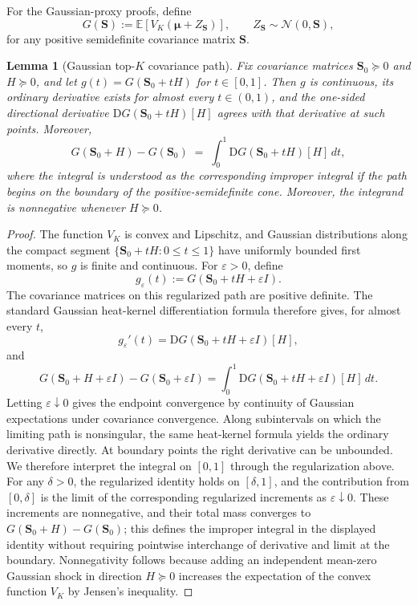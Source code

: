 \documentclass[11pt]{article}
\newtheorem{lemma}[theorem]{Lemma}
\theoremstyle{definition}
\theoremstyle{remark}
\newcommand{\E}{\mathbb{E}}
\newcommand{\1}{\mathbf{1}}
\newcommand{\Normal}{\mathcal{N}}
\newcommand{\bmu}{\boldsymbol{\mu}}
\newcommand{\bS}{\mathbf{S}}
\begin{document}
\medskip

For the Gaussian-proxy proofs, define
\[
G(\bS):=\E\!\left[V_K(\bmu+Z_{\bS})\right],
\qquad Z_{\bS}\sim\Normal(0,\bS),
\]
for any positive semidefinite covariance matrix \(\bS\).

\begin{lemma}[Gaussian top-$K$ covariance path]\label{lem:covariance-path}
Fix covariance matrices \(\bS_0\succeq0\) and \(H\succeq0\), and let
\(g(t)=G(\bS_0+tH)\) for \(t\in[0,1]\). Then \(g\) is continuous, its
ordinary derivative exists for almost every \(t\in(0,1)\), and the
one-sided directional derivative \(\mathrm{D}G(\bS_0+tH)[H]\) agrees with
that derivative at such points. Moreover,
\[
G(\bS_0+H)-G(\bS_0)
\;=\;
\int_0^1 \mathrm{D}G(\bS_0+tH)[H]\,dt ,
\]
where the integral is understood as the corresponding improper integral if
the path begins on the boundary of the positive-semidefinite cone.
Moreover, the integrand is nonnegative whenever \(H\succeq0\).
\end{lemma}

\begin{proof}
The function \(V_K\) is convex and Lipschitz, and Gaussian distributions
along the compact segment \(\{\bS_0+tH:0\le t\le1\}\) have uniformly
bounded first moments, so \(g\) is finite and continuous. For
\(\varepsilon>0\), define
\[
g_\varepsilon(t):=G(\bS_0+tH+\varepsilon I).
\]
The covariance matrices on this regularized path are positive definite.
The standard Gaussian heat-kernel differentiation formula therefore gives,
for almost every \(t\),
\[
g_\varepsilon'(t)
=
\mathrm{D}G(\bS_0+tH+\varepsilon I)[H],
\]
and
\[
G(\bS_0+H+\varepsilon I)-G(\bS_0+\varepsilon I)
=
\int_0^1
\mathrm{D}G(\bS_0+tH+\varepsilon I)[H]\,dt .
\]
Letting \(\varepsilon\downarrow0\) gives the endpoint convergence by
continuity of Gaussian expectations under covariance convergence. Along
subintervals on which the limiting path is nonsingular, the same heat-kernel
formula yields the ordinary derivative directly. At boundary points the
right derivative can be unbounded. We therefore interpret the integral on \([0,1]\) through the
regularization above. For any \(\delta>0\), the regularized identity
holds on \([\delta,1]\), and the contribution from
\([0,\delta]\) is the limit of the corresponding regularized increments as
\(\varepsilon\downarrow0\). These increments are nonnegative, and their
total mass converges to \(G(\bS_0+H)-G(\bS_0)\); this defines the
improper integral in the displayed identity without requiring pointwise
interchange of derivative and limit at the boundary. Nonnegativity follows
because adding an independent mean-zero Gaussian shock in direction
\(H\succeq0\) increases the expectation of the convex function \(V_K\) by
Jensen's inequality.
\end{proof}
\end{document}

